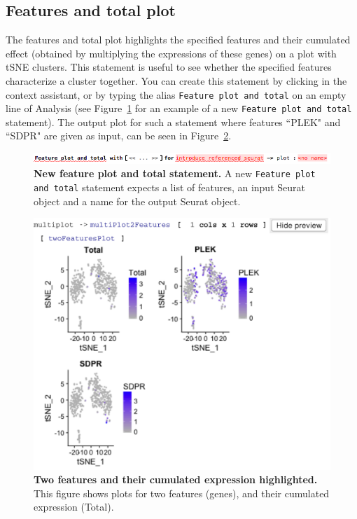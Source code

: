 \subsection{Features and total plot}
The features and total plot highlights the specified features and their cumulated effect
(obtained by multiplying the expressions of these genes) on a plot with tSNE clusters. This statement
is useful to see whether the specified features characterize a cluster together.
You can create this statement by clicking
 in the context assistant, or by typing
the alias \texttt{Feature plot and total} on an empty line of Analysis (see Figure~\ref{fig:FeaturesPlotTotal}
for an example of a new \texttt{Feature plot and total} statement). The output plot
for such a statement where features ``PLEK" and ``SDPR" are given as input, can be seen in
Figure~\ref{fig:TwoFeaturesPlot}.

\begin{figure}[h!tbp]
  \centering
    \includegraphics[width=\figWidthWide]{figures/FeaturesPlotTotal.png}
    \caption[New feature plot and total statement.]{\textbf{New feature plot and total statement.} A new
    \texttt{Feature plot and total} statement expects a list of features, an input Seurat object
    and a name for the output Seurat object.}
\label{fig:FeaturesPlotTotal}
\end{figure}

\begin{figure}
  \centering
    \includegraphics[width=\figWidthNarrow]{figures/TwoFeaturesPlot.pdf}
    \caption[Two features and their cumulated expression highlighted.]{\textbf{Two features
    and their cumulated expression highlighted.} This figure shows plots for two features (genes),
    and their cumulated expression (Total).}
\label{fig:TwoFeaturesPlot}
\end{figure}

